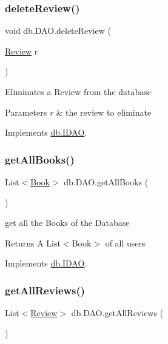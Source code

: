 \subsubsection{\texorpdfstring{delete\+Review()}{deleteReview()}}
{\footnotesize\ttfamily void db.\+D\+A\+O.\+delete\+Review (\begin{DoxyParamCaption}\item[{\hyperlink{classserver_1_1data_1_1_review}{Review}}]{r }\end{DoxyParamCaption})}

Eliminates a Review from the database 
\begin{DoxyParams}{Parameters}
{\em r} & the review to eliminate \\
\hline
\end{DoxyParams}


Implements \hyperlink{interfacedb_1_1_i_d_a_o_a78ca80bc2f2b660edeb9eddd8ca9a4b7}{db.\+I\+D\+AO}.

\mbox{\label{classdb_1_1_d_a_o_a82a8c60ccd0de2f70b69bc36d29aeef8}} 
\subsubsection{\texorpdfstring{get\+All\+Books()}{getAllBooks()}}
{\footnotesize\ttfamily List$<$\hyperlink{classserver_1_1data_1_1_book}{Book}$>$ db.\+D\+A\+O.\+get\+All\+Books (\begin{DoxyParamCaption}{ }\end{DoxyParamCaption})}

get all the Books of the Database \begin{DoxyReturn}{Returns}
A List$<$\+Book$>$ of all users 
\end{DoxyReturn}


Implements \hyperlink{interfacedb_1_1_i_d_a_o_a75a5ebcd7c3421ae7cccc8e2f3b2d9f9}{db.\+I\+D\+AO}.

\mbox{\label{classdb_1_1_d_a_o_a4df79c7d44b050aa55451db2ecf342f6}} 
\subsubsection{\texorpdfstring{get\+All\+Reviews()}{getAllReviews()}}
{\footnotesize\ttfamily List$<$\hyperlink{classserver_1_1data_1_1_review}{Review}$>$ db.\+D\+A\+O.\+get\+All\+Reviews (\begin{DoxyParamCaption}{ }\end{DoxyParamCaption})}

